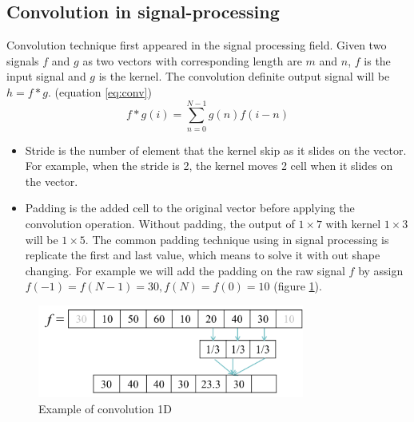 \subsection{Convolution in signal-processing}
Convolution technique first appeared in the signal processing field. Given two signals $f$ and $g$ as two vectors with corresponding length are $m$ and $n$, $f$ is the input signal and $g$ is the kernel. The convolution definite output signal will be $h = f \ast g$. (equation \ref{eq:conv})
\begin{equation}
    \label{eq:conv}
    f \ast g(i) = \sum_{n=0}^{N-1}{g(n)f(i-n)}
\end{equation}
\begin{itemize}
    \item Stride is the number of element that the kernel skip as it slides on the vector. For example, when the stride is 2, the kernel moves 2 cell when it slides on the vector.
    \item Padding is the added cell to the original vector before applying the convolution operation. Without padding, the output of $1 \times 7$ with kernel $1 \times 3$ will be $1 \times 5$.
    The common padding technique using in signal processing is replicate the first and last value, which means to solve it with out shape changing. For example we will add the padding on the raw signal $f$ by assign $f(-1) = f(N-1) = 30, f(N) = f(0) = 10$ (figure \ref{fig:conv1d}).
\end{itemize}
\begin{figure}
    \centering
    \includegraphics[height=1.2in]{content/resources/new_images/background/conv1d.png}
    \caption{Example of convolution 1D}
    \label{fig:conv1d}
\end{figure}


